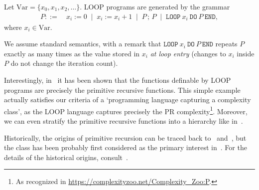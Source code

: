 \begin{definition}
Let \(\mathrm{Var}=\{x_0,x_1,x_2,\dots\}\).
LOOP programs are generated by the grammar
\[
\begin{aligned}
P ::=~& x_i := 0
\;\mid\; x_i := x_i + 1
\;\mid\; P \,;\, P
\;\mid\; \texttt{LOOP}~x_i~\texttt{DO}~P~\texttt{END},
\end{aligned}
\]
where \(x_i\in\mathrm{Var}\).

\noindent
We assume standard semantics, with a remark that \(\texttt{LOOP}~x_i~\texttt{DO}~P~\texttt{END}\) repeats \(P\) exactly as many times as the value stored in \(x_i\) \emph{at loop entry} (changes to \(x_i\) inside \(P\) do not change the iteration count).
\end{definition}

Interestingly, in~\cite{10.1145/800196.806014} it has been shown that the functions definable by LOOP programs
are precisely the primitive recursive functions.
This simple example actually satisfies our criteria of a `programming language capturing a complexity class', as
the LOOP language captures precisely the PR complexity\footnote{As recognized in \url{https://complexityzoo.net/Complexity_Zoo:P}.}.
Moreover, we can even stratify the primitive recursive functions into a hierarchy like in~\cite{Grzegorczyk1953}.


Historically, the origins of primitive recursion can be traced back to~\cite{Grassmann1861} and~\cite{Dedekind1888},
but the class has been probably first considered as the primary interest in~\cite{Skolem1923-vanHeijenoort}.
For the details of the historical origins, consult~\cite{Adams2011}.




